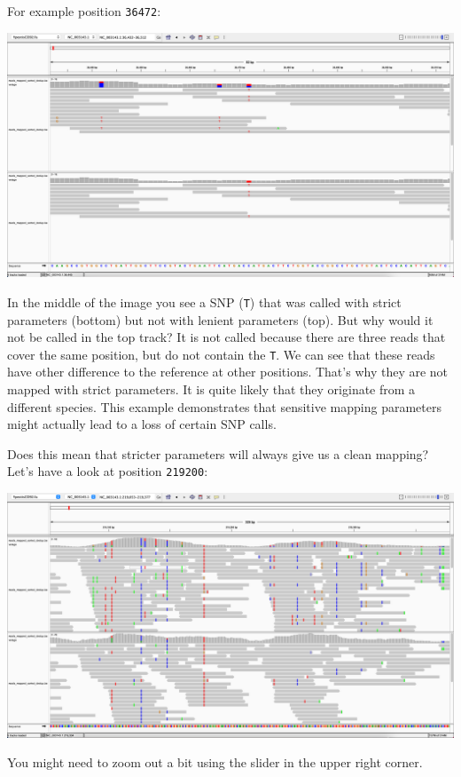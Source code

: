 \documentclass[
  letterpaper,
]{book}
\begin{document}
For example position \texttt{36472}:

\includegraphics{assets/images/chapters/genome-mapping/IGV_SNP_36472.png}

In the middle of the image you see a SNP (\texttt{T}) that was called
with strict parameters (bottom) but not with lenient parameters (top).
But why would it not be called in the top track? It is not called
because there are three reads that cover the same position, but do not
contain the \texttt{T}. We can see that these reads have other
difference to the reference at other positions. That's why they are not
mapped with strict parameters. It is quite likely that they originate
from a different species. This example demonstrates that sensitive
mapping parameters might actually lead to a loss of certain SNP calls.

Does this mean that stricter parameters will always give us a clean
mapping? Let's have a look at position \texttt{219200}:

\includegraphics{assets/images/chapters/genome-mapping/IGV_SNP_219200.png}

You might need to zoom out a bit using the slider in the upper right
corner.
\end{document}
